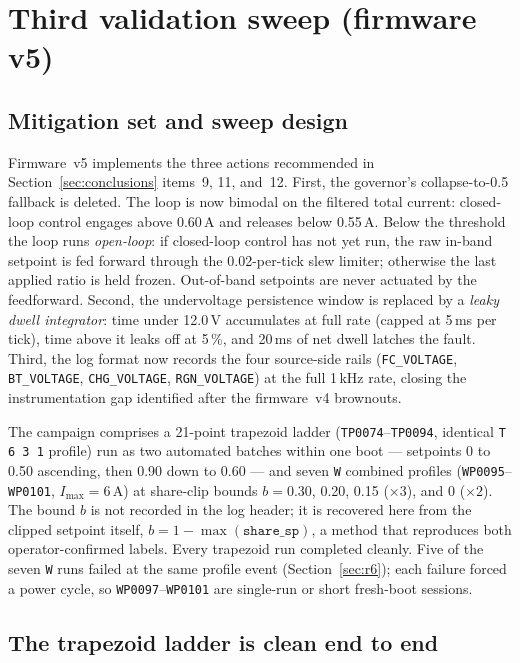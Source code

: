 \documentclass[11pt]{article}
\newcommand{\code}[1]{\texttt{#1}}
\begin{document}
\section{Third validation sweep (firmware v5)}
\label{sec:v5}

\subsection{Mitigation set and sweep design}

Firmware~v5 implements the three actions recommended in
Section~\ref{sec:conclusions} items~9, 11, and~12. First, the governor's
collapse-to-0.5 fallback is deleted. The loop is now bimodal on the filtered
total current: closed-loop control engages above 0.60\,A and releases below
0.55\,A. Below the threshold the loop runs \emph{open-loop}: if closed-loop
control has not yet run, the raw in-band setpoint is fed forward through the
0.02-per-tick slew limiter; otherwise the last applied ratio is held frozen.
Out-of-band setpoints are never actuated by the feedforward. Second, the
undervoltage persistence window is replaced by a \emph{leaky dwell integrator}:
time under 12.0\,V accumulates at full rate (capped at 5\,ms per tick), time
above it leaks off at 5\,\%, and 20\,ms of net dwell latches the fault. Third,
the log format now records the four source-side rails (\code{FC\_VOLTAGE},
\code{BT\_VOLTAGE}, \code{CHG\_VOLTAGE}, \code{RGN\_VOLTAGE}) at the full 1\,kHz
rate, closing the instrumentation gap identified after the firmware~v4
brownouts.

The campaign comprises a 21-point trapezoid ladder
(\code{TP0074}--\code{TP0094}, identical \code{T 6 3 1} profile) run as two
automated batches within one boot --- setpoints 0 to 0.50 ascending, then 0.90
down to 0.60 --- and seven \code{W} combined profiles
(\code{WP0095}--\code{WP0101}, $I_\mathrm{max}=6$\,A) at share-clip bounds
$b = 0.30$, 0.20, 0.15 ($\times3$), and 0 ($\times2$). The bound $b$ is not
recorded in the log header; it is recovered here from the clipped setpoint
itself, $b = 1 - \max(\code{share\_sp})$, a method that reproduces both
operator-confirmed labels. Every trapezoid run completed cleanly. Five of the
seven \code{W} runs failed at the same profile event
(Section~\ref{sec:r6}); each failure forced a power cycle, so
\code{WP0097}--\code{WP0101} are single-run or short fresh-boot sessions.

\subsection{The trapezoid ladder is clean end to end}
\end{document}
